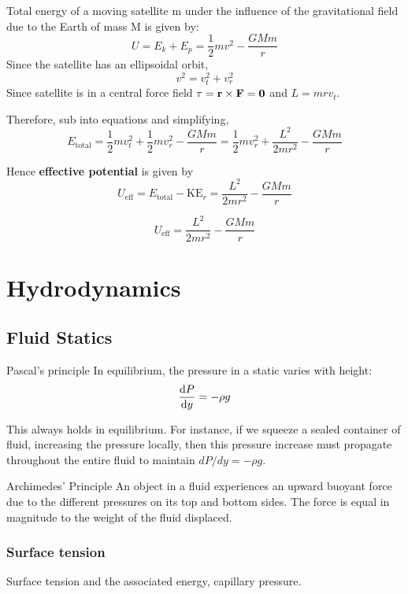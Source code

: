 \begin{derivation}
Total energy of a moving satellite m under the influence of the gravitational field due to the Earth of mass M is given by: 
\[ U = E_k+E_p = \frac{1}{2}mv^2 - \frac{GMm}{r} \]
Since the satellite has an ellipsoidal orbit,
\[ v^2 = v_t^2 + v_r^2 \]
Since satellite is in a central force field $\tau=\vb{r}\times\vb{F}=\mathbf{0}$ and $L=mrv_t$.

Therefore, sub into equations and simplifying, 
\[ E_\text{total} = \frac{1}{2}mv_t^2 + \frac{1}{2}mv_r^2 - \frac{GMm}{r} = \boxed{\frac{1}{2}mv_r^2 + \frac{L^2}{2mr^2} - \frac{GMm}{r}} \]
\end{derivation}

Hence \textbf{effective potential} is given by
\[ U_\text{eff} = E_\text{total} - \text{KE}_r = \boxed{\frac{L^2}{2mr^2} - \frac{GMm}{r}} \]

\begin{equation}
U_\text{eff} = \frac{L^2}{2mr^2} - \frac{GMm}{r}
\end{equation}

\chapter{Hydrodynamics}
\section{Fluid Statics}
\begin{thrm}{Pascal's principle}{}
In equilibrium, the pressure in a static varies with height:
\begin{equation}
\dv{P}{y}=-\rho g
\end{equation}

This always holds in equilibrium. For instance, if we squeeze a sealed container of fluid, increasing the pressure locally, then this pressure increase must propagate throughout the entire fluid to maintain $dP/dy = -\rho g$.
\end{thrm}

\begin{thrm}{Archimedes' Principle}{}
An object in a fluid experiences an upward buoyant force due to the different pressures on its top and bottom sides. The force is equal in magnitude to the weight of the fluid displaced.
\end{thrm}

\subsection{Surface tension}
Surface tension and the associated energy, capillary pressure.
\pagebreak

